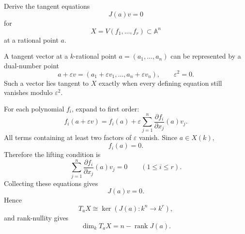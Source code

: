 \begin{problem}\label{prob:vi32-12}
Derive the tangent equations
\[
J(a)v=0
\]
for
\[
X=V(f_1,\ldots,f_r)\subset\mathbb A^n
\]
at a rational point \(a\).

\end{problem}

\ifdefined\FullProblemDossiers
\begin{solution}
A tangent vector at a \(k\)-rational point \(a=(a_1,\ldots,a_n)\) can be represented by a dual-number point
\[
a+\varepsilon v
=
(a_1+\varepsilon v_1,\ldots,a_n+\varepsilon v_n),
\qquad
\varepsilon^2=0.
\]
Such a vector lies tangent to \(X\) exactly when every defining equation still vanishes modulo \(\varepsilon^2\).

For each polynomial \(f_i\), expand to first order:
\[
f_i(a+\varepsilon v)
=
f_i(a)
+
\varepsilon
\sum_{j=1}^n
\frac{\partial f_i}{\partial x_j}(a)v_j.
\]
All terms containing at least two factors of \(\varepsilon\) vanish. Since \(a\in X(k)\),
\[
f_i(a)=0.
\]
Therefore the lifting condition is
\[
\sum_{j=1}^n
\frac{\partial f_i}{\partial x_j}(a)v_j
=
0
\qquad
(1\le i\le r).
\]
Collecting these equations gives
\[
\boxed{J(a)v=0}.
\]
Hence
\[
T_aX\cong\ker(J(a):k^n\to k^r),
\]
and rank-nullity gives
\[
\boxed{\dim_kT_aX=n-\operatorname{rank}J(a)}.
\]
\end{solution}
\fi
